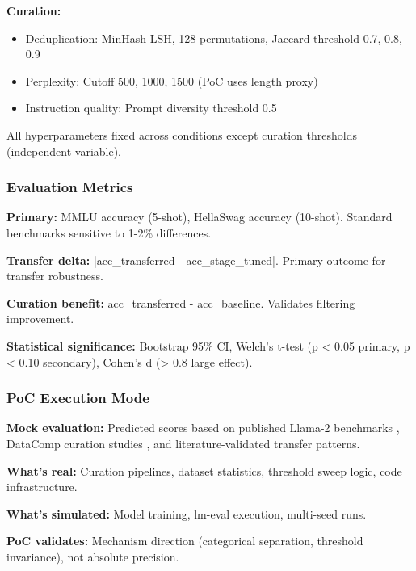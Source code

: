 \textbf{Curation:}
\begin{itemize}
\item Deduplication: MinHash LSH, 128 permutations, Jaccard threshold {0.7, 0.8, 0.9}
\item Perplexity: Cutoff {500, 1000, 1500} (PoC uses length proxy)
\item Instruction quality: Prompt diversity threshold 0.5
\end{itemize}

All hyperparameters fixed across conditions except curation thresholds (independent variable).

\subsubsection{Evaluation Metrics}

\textbf{Primary:} MMLU accuracy (5-shot), HellaSwag accuracy (10-shot). Standard benchmarks sensitive to 1-2\% differences.

\textbf{Transfer delta:} |acc\_transferred - acc\_stage\_tuned|. Primary outcome for transfer robustness.

\textbf{Curation benefit:} acc\_transferred - acc\_baseline. Validates filtering improvement.

\textbf{Statistical significance:} Bootstrap 95\% CI, Welch's t-test (p < 0.05 primary, p < 0.10 secondary), Cohen's d (> 0.8 large effect).

\subsubsection{PoC Execution Mode}

\textbf{Mock evaluation:} Predicted scores based on published Llama-2 benchmarks \citep{Touvron2023Llama}, DataComp curation studies \citep{Gadre2023DataComp}, and literature-validated transfer patterns.

\textbf{What's real:} Curation pipelines, dataset statistics, threshold sweep logic, code infrastructure.

\textbf{What's simulated:} Model training, lm-eval execution, multi-seed runs.

\textbf{PoC validates:} Mechanism direction (categorical separation, threshold invariance), not absolute precision.
